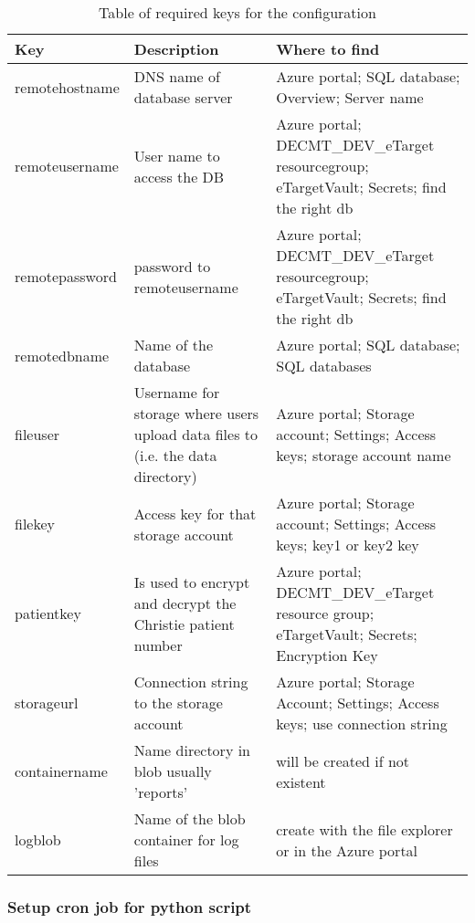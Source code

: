 \begin{table}[ht!]
  \setlength\extrarowheight{2pt}
  \begin{center}
    \caption{Table of required keys for the configuration}
    \label{tab:table1}
    \begin{tabularx}{\textwidth}{|l|L|L|} %
      \hline
      \textbf{Key} & \textbf{Description} & \textbf{Where to find}\\
      \hline
      remotehostname & DNS name of database server & Azure portal; SQL database; Overview; Server name\\
      remoteusername & User name to access the DB & Azure portal; DECMT\_DEV\_eTarget resourcegroup; eTargetVault; Secrets; find the right db \\
      remotepassword & password to remoteusername & Azure portal; DECMT\_DEV\_eTarget resourcegroup; eTargetVault; Secrets; find the right db \\
      remotedbname & Name of the database & Azure portal; SQL database; SQL databases\\
      fileuser & Username for storage where users upload data files to (i.e. the data directory) & Azure portal; Storage account; Settings; Access keys; storage account name\\
      filekey & Access key for that storage account & Azure portal; Storage account; Settings; Access keys; key1 or key2 key\\
	  patientkey & Is used to encrypt and decrypt the Christie patient number & Azure portal; DECMT\_DEV\_eTarget resource group; eTargetVault; Secrets; Encryption Key\\
      storageurl & Connection string to the storage account & Azure portal; Storage Account; Settings; Access keys; use connection string\\
      containername & Name directory in blob usually 'reports' & will be created
      if not existent\\
      logblob & Name of the blob container for log files & create with the file explorer or in the Azure portal\\
      \hline
    \end{tabularx}
  \end{center}
\end{table}

\subsubsection{Setup cron job for python script}

